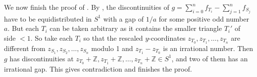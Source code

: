 \documentclass[a4paper]{amsart}
\theoremstyle{plain}
\theoremstyle{definition}
\begin{document}
We now finish the proof of . By , the discontinuities of \(g = \sum_{i=0}^n f_{T_i} - \sum_{j=1}^n f_{S_j}\) have to be equidistributed in \(S^1\) with a gap of \(1/a\) for some positive odd number \(a\).
But each \(T_i\) can be taken arbitrary as it contains the smaller triangle \(T_i'\) of side \(< 1\). So take each \(T_i\) so that the rescaled \(y\)-coordinates \(z_{T_0}, z_{T_1}, \dots, z_{T_n}\) are different from \(z_{S_1}, z_{S_2}, \dots, z_{S_n}\) modulo 1 and \(z_{T_1} - z_{T_0}\) is an irrational number.
Then \(g\) has discontinuities at \(z_{T_0} + \mathbb{Z}, z_{T_1} + \mathbb{Z}, \dots, z_{T_n} + \mathbb{Z} \in S^1\), and two of them has an irrational gap. This gives contradiction and finishes the proof.



\end{document}
